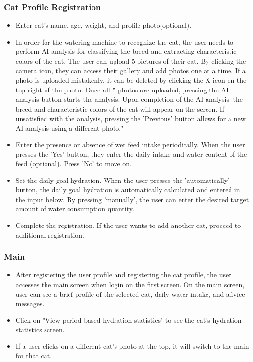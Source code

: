 \documentclass[conference]{IEEEtran}
\begin{document}
\subsubsection{Cat Profile Registration}
\begin{itemize}
    \begin{itemize}
        \item Enter cat's name, age, weight, and profile photo(optional).
        \item In order for the watering machine to recognize the cat, the user needs to perform AI analysis for classifying the breed and extracting characteristic colors of the cat. The user can upload 5 pictures of their cat. By clicking the camera icon, they can access their gallery and add photos one at a time. If a photo is uploaded mistakenly, it can be deleted by clicking the X icon on the top right  of the photo. Once all 5 photos are uploaded, pressing the AI analysis button starts the analysis. Upon completion of the AI analysis, the breed and characteristic colors of the cat will appear on the screen. If unsatisfied with the analysis, pressing the 'Previous' button allows for a new AI analysis using a different photo."
        \item Enter the presence or absence of wet feed intake periodically. When the user presses the 'Yes' button, they enter the daily intake and water content of the feed (optional). Press 'No' to move on.
        \item Set the daily goal hydration. When the user presses the 'automatically' button, the daily goal hydration is automatically calculated and entered in the input below. By pressing 'manually', the user can enter the desired target amount of water consumption quantity.
        \item Complete the registration. If the user wants to add another cat, proceed to additional registration.
        \vspace{0.3cm}
    \end{itemize}
\end{itemize}

\subsubsection{Main}
\begin{itemize}
    \begin{itemize}
        \item After registering the user profile and registering the cat profile, the user accesses the main screen when login on the first screen. On the main screen, user can see a brief profile of the selected cat, daily water intake, and advice messages.
        \item Click on "View period-based hydration statistics" to see the cat's hydration statistics screen.
        \item If a user clicks on a different cat's photo at the top, it will switch to the main for that cat.
        \vspace{0.3cm}
    \end{itemize}
\end{itemize}
\end{document}
